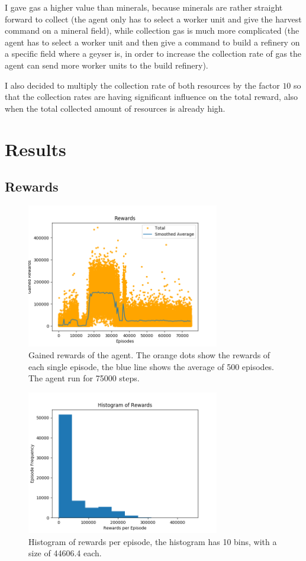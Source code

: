 \documentclass{article}
\begin{document}
I gave gas a higher value than minerals, because minerals are rather straight 
forward to collect (the agent only has to select a worker unit and give the 
harvest command on a mineral field), while collection gas is much more 
complicated (the agent has to select a worker unit and then give a command to 
build a refinery on a specific field where a geyser is, in order to increase 
the collection rate of gas the agent can send more worker units to the build 
refinery).

I also decided to multiply the collection rate of both resources by the factor 
$10$ so that the collection rates are having significant influence on the total 
reward, also when the total collected amount of resources is already high.

\section{Results}
\subsection{Rewards}
\begin{figure}
\includegraphics[width=0.75\textwidth]{rewards.png}
\caption{Gained rewards of the agent. The orange dots show the rewards of each 
single episode, the blue line shows the average of 500 episodes. The agent run 
for 75000 steps.}
\label{rewards}
\end{figure}

\begin{figure}
\includegraphics[width=0.75\textwidth]{rewards_histogram.png}
\caption{Histogram of rewards per episode, the histogram has 10 bins, with a 
size of 44606.4 each.}
\label{rewards_histogram}
\end{figure}
\end{document}
